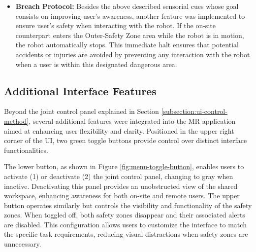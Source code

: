 \begin{itemize}
\item \textbf{Breach Protocol:} Besides the above described sensorial cues whose goal consists on improving user's awareness, another feature was implemented to ensure user's safety when interacting with the robot. If the on-site counterpart enters the Outer-Safety Zone area while the robot is in motion, the robot automatically stops. This immediate halt ensures that potential accidents or injuries are avoided by preventing any interaction with the robot when a user is within this designated dangerous area.
\end{itemize}
    
\subsection{Additional Interface Features}


Beyond the joint control panel explained in Section \ref{subsection:ui-control-method}, several additional features were integrated into the \ac{MR} application aimed at enhancing user flexibility and clarity. Positioned in the upper right corner of the \ac{UI}, two green toggle buttons provide control over distinct interface functionalities.

The lower button, as shown in Figure \ref{fig:menu-toggle-button}, enables users to activate (1) or deactivate (2) the joint control panel, changing to gray when inactive. Deactivating this panel provides an unobstructed view of the shared workspace, enhancing awareness for both on-site and remote users. The upper button operates similarly but controls the visibility and functionality of the safety zones. When toggled off, both safety zones disappear and their associated alerts are disabled. This configuration allows users to customize the interface to match the specific task requirements, reducing visual distractions when safety zones are unnecessary.

